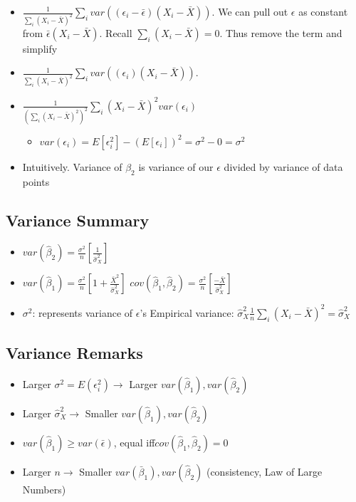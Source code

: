 \documentclass[10pt, oneside]{article}
\begin{document}
\begin{itemize}
\begin{itemize}
    \end{itemize}
    \item $\frac{1}{\sum_i (X_i -\bar X)^2}\sum_i var( (\epsilon_i -\bar \epsilon)(X_i -\bar X))$. We can pull out $\epsilon$ as constant from $\bar \epsilon(X_i - \bar X)$. Recall $\sum_i (X_i - \bar X)=0$. Thus remove the term and simplify
    \item $\frac{1}{\sum_i (X_i -\bar X)^2}\sum_i var( (\epsilon_i)(X_i -\bar X))$.
    \item $\frac{1}{(\sum_i (X_i -\bar X)^2)^2} \sum_i (X_i -\bar X) ^2 var(\epsilon_i)$
    \begin{itemize}
        \item $var(\epsilon_i) = E[\epsilon_i^2] - (E[\epsilon_i])^2 = \sigma^2 - 0 =\sigma^2$
    \end{itemize}
    \item Intuitively. Variance of $\beta_2$ is variance of our $\epsilon$ divided by variance of data points
\end{itemize}

\subsection{Variance Summary}
\begin{itemize}
    \item $var(\hat \beta_2) = \frac{\sigma^2}{n} [\frac{1}{\hat \sigma^2 _X}]$
    \item $var(\hat \beta_1 ) = \frac{\sigma^2}{n}[1+\frac{\bar X^2}{\hat \sigma^2 _X}]$
    $cov(\hat \beta_1 ,\hat \beta_2) = \frac{\sigma^2}{n}[\frac{-\bar X}{\hat \sigma^2 _X}]$
    \item $\sigma^2$: represents variance of $\epsilon$'s
    Empirical variance: $\hat \sigma^2_X \frac{1}{n} \sum_i (X_i -\bar X)^2 = \hat \sigma_X ^2$
    \end{itemize}

\subsection{Variance Remarks}
\begin{itemize}
    \item Larger $\sigma^2 = E(\epsilon_i ^2) \rightarrow $ Larger $var(\hat \beta_1), var(\hat \beta_2)$
    \item Larger $\hat \sigma^2 _X \rightarrow $ Smaller $var(\hat \beta_1), var(\hat \beta_2)$
    \item $var(\hat \beta_1) \geq var(\bar \epsilon)$, equal iff$cov(\hat \beta_1, \hat \beta_2) =0$
    \item Larger $n\rightarrow $ Smaller $var(\bar \beta_1), var(\hat \beta_2)$ (consistency, Law of Large Numbers)
\end{itemize}
\end{document}
